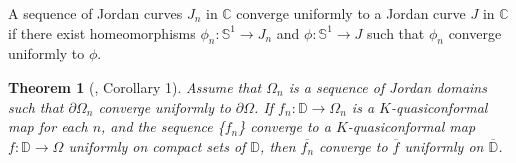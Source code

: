 \documentclass[12pt]{amsart}
\newtheorem{theorem}{Theorem}[section]
\def\C{\mathbb{C}}
\def\D{\mathbb{D}}
\begin{document}
A sequence of Jordan curves
$J_n$ in $\C$ converge uniformly to a Jordan curve $J$
in $\C$ if there exist homeomorphisms $\phi_n: \mathbb S^1 \to
J_n$ and $\phi: \mathbb S^1 \to J$ such that $\phi_n$ converge
uniformly to $\phi$.

\begin{theorem}[\cite{Pal}, Corollary 1] \label{pal} Assume that $\Omega_n$ is a sequence of Jordan domains such that $\partial \Omega_n$ converge uniformly to  $\partial \Omega$.  If $f_n: \D \to \Omega_n $ is a  $K$-quasiconformal map for each $n$, and the sequence \{$f_n$\}
converge to a $K$-quasiconformal map $f: \D \to \Omega$ uniformly
on compact sets of $\D$, then $\overline{f_n}$ converge to
$\overline{f}$ uniformly on $\overline{\D}$.
\end{theorem}



\end{document}
